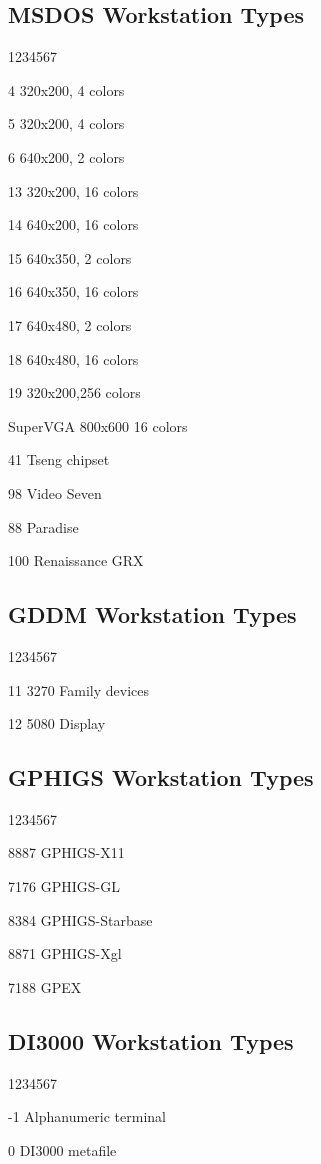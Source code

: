 \subsection{MSDOS Workstation Types}
\begin{DLtt}{1234567}
\item[4]   320x200,  4 colors
\item[5]   320x200,  4 colors
\item[6]   640x200,  2 colors
\item[13]   320x200, 16 colors
\item[14]   640x200, 16 colors
\item[15]   640x350,  2 colors
\item[16]   640x350, 16 colors
\item[17]   640x480,  2 colors
\item[18]   640x480, 16 colors
\item[19]   320x200,256 colors
\item[SuperVGA]   800x600  16 colors
\item[41]   Tseng chipset
\item[98]   Video Seven
\item[88]   Paradise
\item[100]   Renaissance GRX
\end{DLtt}

\subsection{GDDM Workstation Types}
\begin{DLtt}{1234567}
\item[11]  3270 Family devices
\item[12]  5080 Display
\end{DLtt}

\subsection{GPHIGS Workstation Types}
\begin{DLtt}{1234567}
\item[8887]  GPHIGS-X11
\item[7176]  GPHIGS-GL
\item[8384]  GPHIGS-Starbase
\item[8871]  GPHIGS-Xgl
\item[7188]  GPEX
\end{DLtt}

\subsection{DI3000 Workstation Types}
\begin{DLtt}{1234567}
\item[-1]  Alphanumeric terminal
\item[0]  DI3000 metafile
\end{DLtt}


